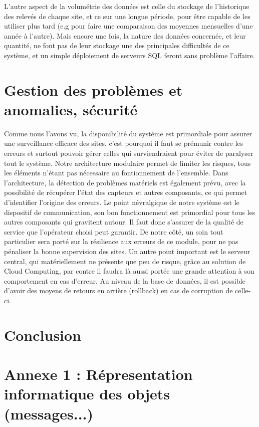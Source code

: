 L'autre aspect de la volumétrie des données est celle du stockage de l'historique des relevés de chaque site, et ce sur une longue période, pour être capable de les utiliser plus tard (e.g pour faire une comparaison des moyennes mensuelles d'une année à l'autre). Mais encore une fois, la nature des données concernée, et leur quantité, ne font pas de leur stockage une des principales difficultés de ce système, et un simple déploiement de serveurs SQL feront sans problème l'affaire.

\section{Gestion des problèmes et anomalies, sécurité}

Comme nous l'avons vu, la disponibilité du système est primordiale pour assurer une surveillance efficace des sites, c'est pourquoi il faut se prémunir contre les erreurs et surtout pouvoir gérer celles qui surviendraient pour éviter de paralyser tout le système. Notre architecture modulaire permet de limiter les risques, tous les éléments n'étant pas nécessaire au fontionnement de l'ensemble.
Dans l'architecture, la détection de problèmes matériels est également prévu, avec la possibilité de récupérer l'état des capteurs et autres composants, ce qui permet d'identifier l'origine des erreurs.
Le point névralgique de notre système est le dispositif de communication, son bon fonctionnement est primordial pour tous les autres composants qui gravitent autour. Il faut donc s'assurer de la qualité de service que l'opérateur choisi peut garantir. De notre côté, un soin tout particulier sera porté sur la résilience aux erreurs de ce module, pour ne pas pénaliser la bonne supervision des sites.
Un autre point important est le serveur central, qui matériellement ne présente que peu de risque, grâce au solution de Cloud Computing, par contre il faudra là aussi portée une grande attention à son comportement en cas d'erreur. Au niveau de la base de données, il est possible d'avoir des moyens de retours en arrière (rollback) en cas de corruption de celle-ci.

\section{Conclusion}

\newpage
\appendix
\appendixpage

\section{Annexe 1 : Répresentation informatique des objets (messages...)}


